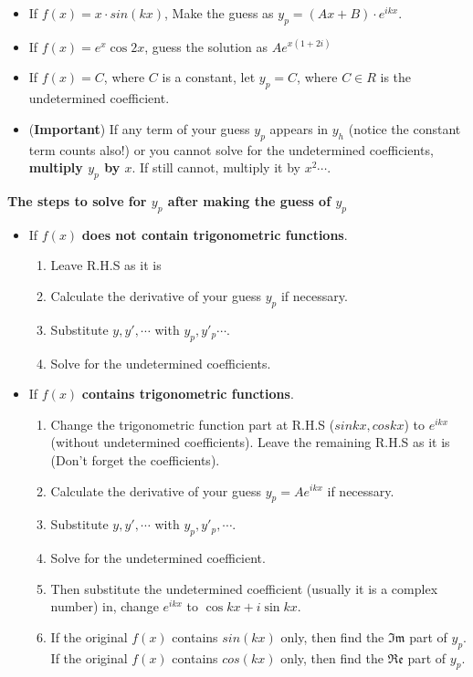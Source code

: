 \documentclass[10pt, landscape]{article}
\begin{document}
\begin{multicols}{4}
\begin{enumerate}
\begin{enumerate}
\begin{itemize}
            \item  If $f(x)=x\cdot sin(kx)$, Make the guess as $y_p=(Ax+B)\cdot e^{ikx}$.
            \item If $f(x)=e^x\cos 2x$, guess the solution as $Ae^{x(1+2i)}$
            \item If $f(x)=C$, where $C$ is a constant, let $y_p=C$, where $C\in R$ is the undetermined coefficient.
            \item (\textbf{Important}) If any term of your guess $y_p$ appears in $y_h$ (notice the constant term counts also!) or you cannot solve for the undetermined coefficients, \textbf{multiply $y_p$ by $x$}. If still cannot, multiply it by $x^2\cdots$.
        \end{itemize}
        \textbf{The steps to solve for $y_p$ after making the guess of $y_p$}
        \begin{itemize}
            \item If $f(x)$ \textbf{does not contain trigonometric functions}.
            \begin{enumerate}
                \item Leave R.H.S as it is
                \item Calculate the derivative of your guess $y_p$ if necessary.
                \item Substitute $y, y', \cdots$ with $y_p, y'_p \cdots$.
                \item Solve for the undetermined coefficients.
            \end{enumerate}
            \item If $f(x)$ \textbf{contains trigonometric functions}.
            \begin{enumerate}
                \item Change the trigonometric function part at R.H.S ($sinkx, coskx$) to $e^{ikx}$ (without undetermined coefficients). Leave the remaining R.H.S as it is (Don't forget the coefficients).
                \item Calculate the derivative of your guess $y_p=Ae^{ikx}$ if necessary.
                \item Substitute $y, y', \cdots$ with $y_p, y'_p, \cdots$.
                \item Solve for the undetermined coefficient.
                \item Then substitute the undetermined coefficient (usually it is a complex number) in, change $e^{ikx}$ to $\cos kx+i\sin kx$.
                \item If the original $f(x)$ contains $sin(kx)$ only, then find the $\Im\mathfrak{m}$ part of $y_p$. If the original $f(x)$ contains $cos(kx)$ only, then find the $\Re\mathfrak{e}$ part of $y_p$.

\end{enumerate}
\end{itemize}
\end{enumerate}
\end{enumerate}
\end{multicols}
\end{document}
